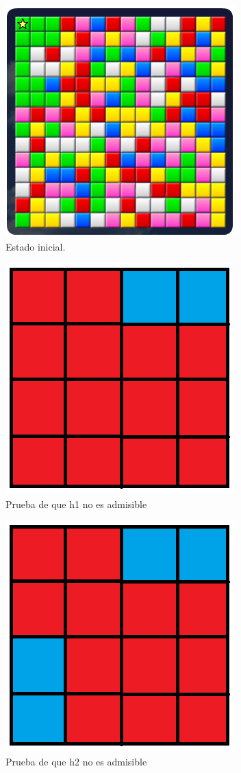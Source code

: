 \documentclass{article}
\begin{document}
\begin{figure}[h!]
  \caption{Estado inicial.}
  \label{regla}
  \centering
    \includegraphics[scale=0.88]{greenRule.png}
\end{figure}

\begin{figure}[h!]
  \caption{Prueba de que h1 no es admisible}
  \label{h1}
  \centering
    \includegraphics[scale=0.88]{h1.png}
\end{figure}

\begin{figure}[h!]
  \caption{Prueba de que h2 no es admisible}
  \label{h2}
  \centering
    \includegraphics[scale=0.88]{h2.png}
\end{figure}
\end{document}
